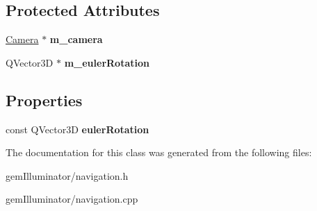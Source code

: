 \subsection*{Protected Attributes}
\begin{DoxyCompactItemize}
\item 
\hypertarget{class_navigation_a76a3e3ea5f8d81a19b22806eb3536302}{}\hyperlink{class_camera}{Camera} $\ast$ {\bfseries m\+\_\+camera}\label{class_navigation_a76a3e3ea5f8d81a19b22806eb3536302}

\item 
\hypertarget{class_navigation_a6b056244895c4250c697f6b924874b05}{}Q\+Vector3\+D $\ast$ {\bfseries m\+\_\+euler\+Rotation}\label{class_navigation_a6b056244895c4250c697f6b924874b05}

\end{DoxyCompactItemize}
\subsection*{Properties}
\begin{DoxyCompactItemize}
\item 
\hypertarget{class_navigation_a34c974ef7c98cf9853a4ac62ab42ac2f}{}const Q\+Vector3\+D {\bfseries euler\+Rotation}\label{class_navigation_a34c974ef7c98cf9853a4ac62ab42ac2f}

\end{DoxyCompactItemize}


The documentation for this class was generated from the following files\+:\begin{DoxyCompactItemize}
\item 
gem\+Illuminator/navigation.\+h\item 
gem\+Illuminator/navigation.\+cpp\end{DoxyCompactItemize}
